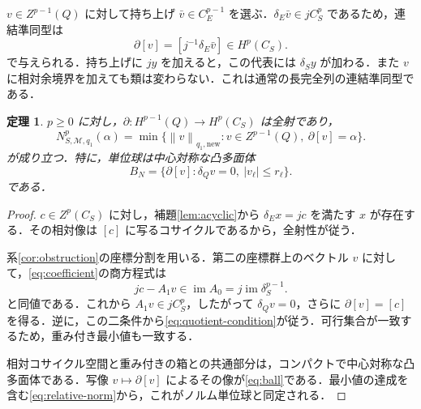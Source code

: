 \documentclass[11pt,a4paper]{article}
\numberwithin{equation}{section}
\theoremstyle{japanese}
\newtheorem{theorem}{定理}[section]
\theoremstyle{remark}
\newcommand{\M}{\mathcal M}
\newcommand{\im}{\operatorname{im}}
\newcommand{\norm}[1]{\left\lVert #1\right\rVert}
\begin{document}
$v\in Z^{p-1}(Q)$ に対して持ち上げ $\bar v\in C_E^{p-1}$ を選ぶ．$\delta_E\bar v\in jC_S^p$ であるため，連結準同型は
\begin{equation}\label{eq:connecting}
 \partial[v]=[j^{-1}\delta_E\bar v]\in H^p(C_S).
\end{equation}
で与えられる．持ち上げに $jy$ を加えると，この代表には $\delta_Sy$ が加わる．また $v$ に相対余境界を加えても類は変わらない．これは通常の長完全列の連結準同型である\cite[Tag~0117]{Stacks}．

\begin{theorem}\label{thm:relative}
$p\ge0$ に対し，$\partial:H^{p-1}(Q)\to H^p(C_S)$ は全射であり，
\begin{equation}\label{eq:relative-norm}
 N^p_{S,\M,q_1}(\alpha)=
 \min\{\norm{v}_{q_1,\mathrm{new}}:v\in Z^{p-1}(Q),\ \partial[v]=\alpha\}.
\end{equation}
が成り立つ．特に，単位球は中心対称な凸多面体
\begin{equation}\label{eq:ball}
 B_N=\{\partial[v]:\delta_Qv=0,\ |v_\ell|\le r_\ell\}.
\end{equation}
である．
\end{theorem}
\begin{proof}
$c\in Z^p(C_S)$ に対し，補題\ref{lem:acyclic}から $\delta_Ex=jc$ を満たす $x$ が存在する．その相対像は $[c]$ に写るコサイクルであるから，全射性が従う．

系\ref{cor:obstruction}の座標分割を用いる．第二の座標群上のベクトル $v$ に対して，\eqref{eq:coefficient}の商方程式は
\begin{equation}\label{eq:quotient-condition}
 jc-A_1v\in\im A_0=j\im\delta_S^{p-1}.
\end{equation}
と同値である．これから $A_1v\in jC_S^p$，したがって $\delta_Qv=0$，さらに $\partial[v]=[c]$ を得る．逆に，この二条件から\eqref{eq:quotient-condition}が従う．可行集合が一致するため，重み付き最小値も一致する．

相対コサイクル空間と重み付きの箱との共通部分は，コンパクトで中心対称な凸多面体である．写像 $v\mapsto\partial[v]$ によるその像が\eqref{eq:ball}である．最小値の達成を含む\eqref{eq:relative-norm}から，これがノルム単位球と同定される．
\end{proof}
\end{document}
